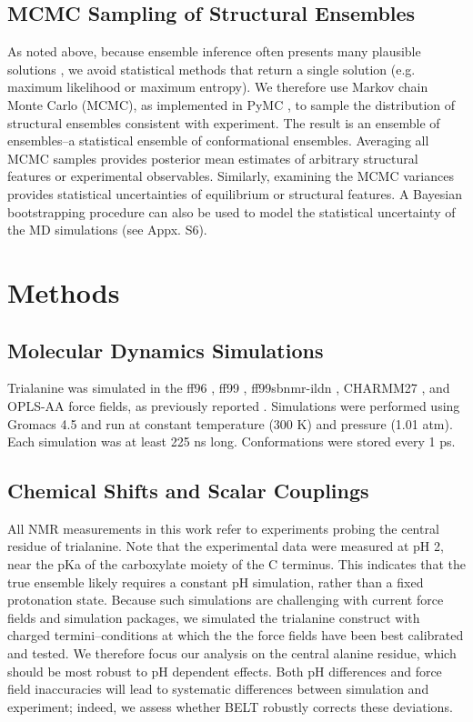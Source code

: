 \documentclass[journal=jacsat,manuscript=article]{achemso}
\begin{document}
\subsection*{MCMC Sampling of Structural Ensembles}

As noted above, because ensemble inference often presents many plausible solutions  \cite{fisher2010, rieping2005}, we avoid statistical methods that return a single solution (e.g. maximum likelihood or maximum entropy).  We therefore use Markov chain Monte Carlo (MCMC), as implemented in PyMC  \cite{patil2010pymc}, to sample the distribution of structural ensembles consistent with experiment.  The result is an ensemble of ensembles--a statistical ensemble of conformational ensembles.  Averaging all MCMC samples provides posterior mean  estimates of arbitrary structural features or experimental observables.  Similarly, examining the MCMC variances provides statistical uncertainties of equilibrium or structural features.  A Bayesian bootstrapping procedure  \cite{rubin1981} can also be used to model the statistical uncertainty of the MD simulations (see Appx. S6).

\section*{Methods}

\subsection*{Molecular Dynamics Simulations}

Trialanine was simulated in the ff96 \cite{kollman1996}, ff99 \cite{wang2000}, ff99sbnmr-ildn \cite{li2010, Lindorff-Larsen2010}, CHARMM27 \cite{mackerell2004extending,bjelkmar2010implementation}, and OPLS-AA \cite{kaminski2001evaluation} force fields, as previously reported  \cite{beauchamp2012protein}.  Simulations were performed using Gromacs 4.5  \cite{hess2008} and run at constant temperature (300 K) and pressure (1.01 atm).  Each simulation was at least 225 ns long.  Conformations were stored every 1 ps.  

\subsection*{Chemical Shifts and Scalar Couplings}

All NMR measurements in this work refer to experiments  \cite{Graf2007} probing the central residue of trialanine.  Note that the experimental data were measured at pH 2, near the pKa of the carboxylate moiety of the C terminus.  This indicates that the true ensemble likely requires a constant pH simulation, rather than a fixed protonation state.  Because such simulations are challenging with current force fields and simulation packages, we simulated the trialanine construct with charged termini--conditions at which the the force fields have been best calibrated and tested.  We therefore focus our analysis on the central alanine residue, which should be most robust to pH dependent effects.  Both pH differences and force field inaccuracies will lead to systematic differences  between simulation and experiment; indeed, we assess whether BELT robustly corrects these deviations.  
\end{document}
